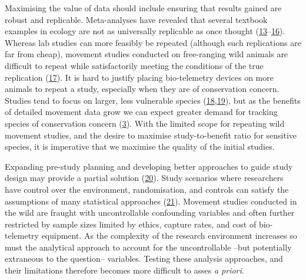 \documentclass[10pt,a4paper]{article}
\begin{document}
Maximising the value of data should include ensuring that results gained are robust and replicable.
Meta-analyses have revealed that several textbook examples in ecology are not as universally replicable as once thought (\protect\hyperlink{ref-clark_ocean_2020}{13}--\protect\hyperlink{ref-wang_irreproducible_2018}{16}).
Whereas lab studies can more feasibly be repeated (although such replications are far from cheap), movement studies conducted on free-ranging wild animals are difficult to repeat while satisfactorily meeting the conditions of the true replication (\protect\hyperlink{ref-fraser_role_2020}{17}).
It is hard to justify placing bio-telemetry devices on more animals to repeat a study, especially when they are of conservation concern.
Studies tend to focus on larger, less vulnerable species (\protect\hyperlink{ref-crane_lots_2021}{18},\protect\hyperlink{ref-tam_quantifying_2021}{19}), but as the benefits of detailed movement data grow we can expect greater demand for tracking species of conservation concern (\protect\hyperlink{ref-Fraser2018}{3}).
With the limited scope for repeating wild movement studies, and the desire to maximise study-to-benefit ratio for sensitive species, it is imperative that we maximise the quality of the initial studies.

Expanding pre-study planning and developing better approaches to guide study design may provide a partial solution (\protect\hyperlink{ref-williams_optimizing_2020}{20}).
Study scenarios where researchers have control over the environment, randomisation, and controls can satisfy the assumptions of many statistical approaches (\protect\hyperlink{ref-christie_simple_2019}{21}).
Movement studies conducted in the wild are fraught with uncontrollable confounding variables and often further restricted by sample sizes limited by ethics, capture rates, and cost of bio-telemetry equipment.
As the complexity of the research environment increases so must the analytical approach to account for the uncontrollable --but potentially extraneous to the question-- variables.
Testing these analysis approaches, and their limitations therefore becomes more difficult to asses \emph{a priori}.
\end{document}
